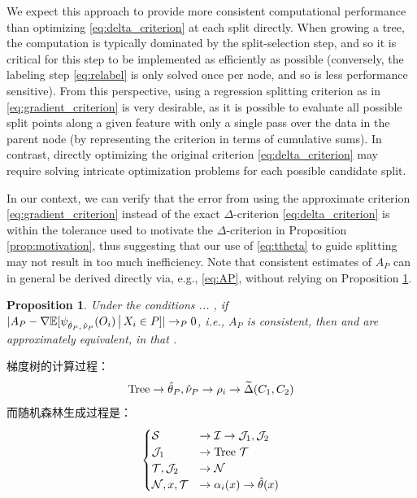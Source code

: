 \documentclass[aos]{imsart}
\theoremstyle{plain}
\newtheorem{prop}{Proposition}
\theoremstyle{definition}
\theoremstyle{remark}
\begin{document}
\begin{CJK}{UTF8}{gbsn}
We expect this approach to provide more consistent computational
performance than optimizing \eqref{eq:delta_criterion} at each split directly.
When growing a tree, the computation is typically dominated by the split-selection step,
and so it is critical for this step to be implemented as efficiently as possible (conversely, the 
labeling step \eqref{eq:relabel} is only solved once per node, and so is less performance sensitive).
From this perspective, using a regression splitting criterion as in \eqref{eq:gradient_criterion} is very
desirable, as it is possible to evaluate all possible split points along a given feature with only
a single pass over the data in the parent node (by representing the criterion in terms of cumulative sums).
In contrast, directly optimizing the original criterion \eqref{eq:delta_criterion} may require
solving intricate optimization problems for each possible candidate split.

In our context, we can verify that the error from using the approximate criterion \eqref{eq:gradient_criterion} instead of
the exact $\Delta$-criterion \eqref{eq:delta_criterion} is within the tolerance used
to motivate the $\Delta$-criterion in Proposition \ref{prop:motivation}, thus suggesting
that our use of \eqref{eq:ttheta} to guide splitting may not result in too much inefficiency.
Note that consistent estimates of $A_P$ can in general be derived directly via, e.g., \eqref{eq:AP},
without relying on Proposition \ref{prop:approximation}.

\begin{prop}
\label{prop:approximation}
Under the conditions ... , if 
$|A_P - \nabla \mathbb{E}[\psi_{\hat{\theta}_P, \, \hat{\nu}_P}(O_i) \,\big|\, X_i \in P]| \rightarrow_P 0$,
i.e., $A_P$ is consistent,
then  and  are approximately equivalent, in that
.
\end{prop}


梯度树的计算过程：
$$
\text{Tree} \to \hat{\theta}_P, \hat{\nu}_P \to \rho_i \to \widetilde{\Delta}(C_1, C_2)
$$
而随机森林生成过程是：
$$
\begin{cases}
\set &\to \ii \to \jj_1, \jj_2 \\
\jj_1 &\to \text{Tree } \tset \\
\tset, \jj_2 &\to \nn \\
\nn, x, \tset &\to \alpha_i(x) \to \htheta(x)
\end{cases}
$$



\end{CJK}
\end{document}
